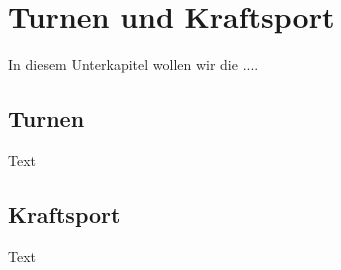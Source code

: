 \section{Turnen und Kraftsport}\label{kap:spo_gymnastics}

In diesem Unterkapitel wollen wir die ....

\subsection{Turnen} \label{kap:spo_turnen}

Text

\subsection{Kraftsport} \label{kap:spo_kraftsport}

Text

